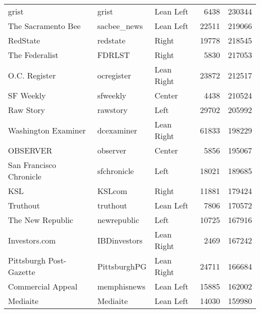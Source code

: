 \begin{center}
\begin{longtable}{lllrr}
                                    grist &            grist &     Lean Left &              6438 &     230344 \\
                       The Sacramento Bee &      sacbee\_news &     Lean Left &             22511 &     219066 \\
                                 RedState &         redstate &         Right &             19778 &     218545 \\
                           The Federalist &           FDRLST &         Right &              5830 &     217053 \\
                            O.C. Register &       ocregister &    Lean Right &             23872 &     212517 \\
                                SF Weekly &         sfweekly &        Center &              4438 &     210524 \\
                                Raw Story &         rawstory &          Left &             29702 &     205992 \\
                      Washington Examiner &       dcexaminer &    Lean Right &             61833 &     198229 \\
                                 OBSERVER &         observer &        Center &              5856 &     195067 \\
                  San Francisco Chronicle &      sfchronicle &          Left &             18021 &     189685 \\
                                      KSL &           KSLcom &         Right &             11881 &     179424 \\
                                 Truthout &         truthout &     Lean Left &              7806 &     170572 \\
                         The New Republic &      newrepublic &          Left &             10725 &     167916 \\
                            Investors.com &     IBDinvestors &    Lean Right &              2469 &     167242 \\
                  Pittsburgh Post-Gazette &     PittsburghPG &    Lean Right &             24711 &     166684 \\
                        Commercial Appeal &      memphisnews &     Lean Left &             15885 &     162002 \\
                                 Mediaite &         Mediaite &     Lean Left &             14030 &     159980 \\

\end{longtable}
\end{center}
